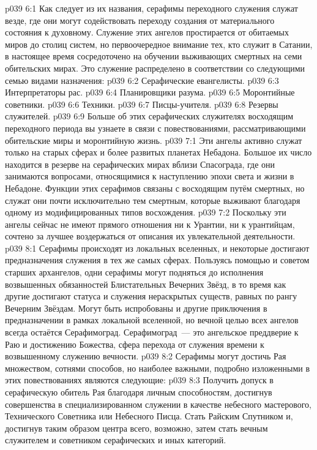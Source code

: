 \vs p039 6:1 Как следует из их названия, серафимы переходного служения служат везде, где они могут содействовать переходу создания от материального состояния к духовному. Служение этих ангелов простирается от обитаемых миров до столиц систем, но первоочередное внимание тех, кто служит в Сатании, в настоящее время сосредоточено на обучении выживающих смертных на семи обительских мирах. Это служение распределено в соответствии со следующими семью видами назначения:
\vs p039 6:2 Серафические евангелисты.
\vs p039 6:3 Интерпретаторы рас.
\vs p039 6:4 Планировщики разума.
\vs p039 6:5 Моронтийные советники.
\vs p039 6:6 Техники.
\vs p039 6:7 Писцы\hyp{}учителя.
\vs p039 6:8 Резервы служителей.
\vs p039 6:9 \pc Больше об этих серафических служителях восходящим переходного периода вы узнаете в связи с повествованиями, рассматривающими обительские миры и моронтийную жизнь.
\vs p039 7:1 Эти ангелы активно служат только на старых сферах и более развитых планетах Небадона. Большое их число находится в резерве на серафических мирах вблизи Спасограда, где они занимаются вопросами, относящимися к наступлению эпохи света и жизни в Небадоне. Функции этих серафимов связаны с восходящим путём смертных, но служат они почти исключительно тем смертным, которые выживают благодаря одному из модифицированных типов восхождения.
\vs p039 7:2 Поскольку эти ангелы сейчас не имеют прямого отношения ни к Урантии, ни к урантийцам, сочтено за лучшее воздержаться от описания их увлекательной деятельности.
\vs p039 8:1 Серафимы происходят из локальных вселенных, и некоторые достигают предназначения служения в тех же самых сферах. Пользуясь помощью и советом старших архангелов, одни серафимы могут подняться до исполнения возвышенных обязанностей Блистательных Вечерних Звёзд, в то время как другие достигают статуса и служения нераскрытых существ, равных по рангу Вечерним Звёздам. Могут быть испробованы и другие приключения в предназначении в рамках локальной вселенной, но вечной целью всех ангелов всегда остаётся Серафимоград. Серафимоград~--- это ангельское преддверие к Раю и достижению Божества, сфера перехода от служения времени к возвышенному служению вечности.
\vs p039 8:2 \pc Серафимы могут достичь Рая множеством, сотнями способов, но наиболее важными, подробно изложенными в этих повествованиях являются следующие:
\vs p039 8:3 Получить допуск в серафическую обитель Рая благодаря личным способностям, достигнув совершенства в специализированном служении в качестве небесного мастерового, Технического Советника или Небесного Писца. Стать Райским Спутником и, достигнув таким образом центра всего, возможно, затем стать вечным служителем и советником серафических и иных категорий.
